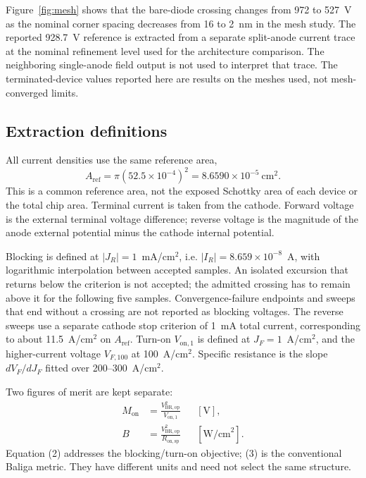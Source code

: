\documentclass[journal,10pt]{IEEEtran}
\newcommand{\Von}{\ensuremath{V_{\mathrm{on},1}}}
\begin{document}
Figure~\ref{fig:mesh} shows that the bare-diode crossing changes from 972 to 527~V as the nominal corner spacing decreases from 16 to 2~nm in the mesh study. The reported 928.7~V reference is extracted from a separate split-anode current trace at the nominal refinement level used for the architecture comparison. The neighboring single-anode field output is not used to interpret that trace. The terminated-device values reported here are results on the meshes used, not mesh-converged limits.

\subsection{Extraction definitions}
All current densities use the same reference area,
\begin{equation}
A_{\mathrm{ref}}=\pi(52.5\times10^{-4})^2=8.6590\times10^{-5}\ \mathrm{cm}^2 .
\end{equation}
This is a common reference area, not the exposed Schottky area of each device or the total chip area. Terminal current is taken from the cathode. Forward voltage is the external terminal voltage difference; reverse voltage is the magnitude of the anode external potential minus the cathode internal potential.

Blocking is defined at $|J_R|=1$~mA/cm$^2$, i.e. $|I_R|=8.659\times10^{-8}$~A, with logarithmic interpolation between accepted samples. An isolated excursion that returns below the criterion is not accepted; the admitted crossing has to remain above it for the following five samples. Convergence-failure endpoints and sweeps that end without a crossing are not reported as blocking voltages. The reverse sweeps use a separate cathode stop criterion of 1~mA total current, corresponding to about 11.5~A/cm$^2$ on $A_{\mathrm{ref}}$. Turn-on $\Von$ is defined at $J_F=1$~A/cm$^2$, and the higher-current voltage $V_{F,100}$ at 100~A/cm$^2$. Specific resistance is the slope $dV_F/dJ_F$ fitted over 200--300~A/cm$^2$.

Two figures of merit are kept separate:
\begin{align}
M_{\mathrm{on}}&=\frac{V_{\mathrm{BR,op}}^2}{V_{\mathrm{on},1}} &&[\mathrm{V}],\\
B&=\frac{V_{\mathrm{BR,op}}^2}{R_{\mathrm{on,sp}}} &&[\mathrm{W/cm}^2].
\end{align}
Equation (2) addresses the blocking/turn-on objective; (3) is the conventional Baliga metric. They have different units and need not select the same structure.
\end{document}
